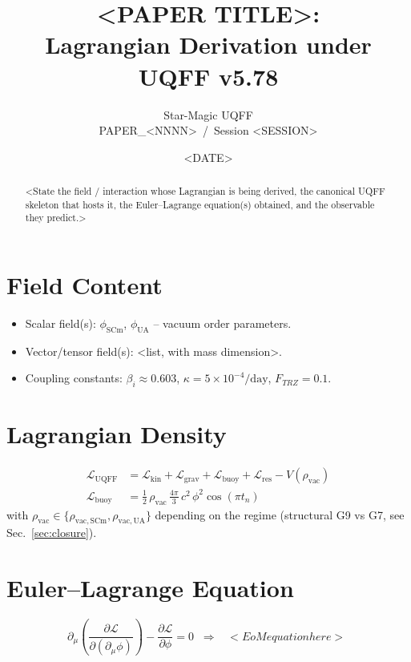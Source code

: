\documentclass[11pt]{article}
\title{<PAPER TITLE>: \\ Lagrangian Derivation under UQFF v5.78}
\author{Star-Magic UQFF \\ PAPER\_<NNNN> \,/\, Session <SESSION>}
\date{<DATE>}
\begin{document}
\maketitle

\begin{abstract}
<State the field / interaction whose Lagrangian is being derived,
the canonical UQFF skeleton that hosts it, the Euler--Lagrange equation(s)
obtained, and the observable they predict.>
\end{abstract}

\section{Field Content}
\begin{itemize}
  \item Scalar field(s): $\phi_{\mathrm{SCm}}$, $\phi_{\mathrm{UA}}$ -- vacuum order parameters.
  \item Vector/tensor field(s): <list, with mass dimension>.
  \item Coupling constants: $\beta_i \approx 0.603$, $\kappa = 5\times 10^{-4}/\mathrm{day}$, $F_{TRZ}=0.1$.
\end{itemize}

\section{Lagrangian Density}
\begin{align}
  \mathcal{L}_{\mathrm{UQFF}} &= \mathcal{L}_{\mathrm{kin}} + \mathcal{L}_{\mathrm{grav}} + \mathcal{L}_{\mathrm{buoy}} + \mathcal{L}_{\mathrm{res}} - V(\rho_{\mathrm{vac}}) \\
  \mathcal{L}_{\mathrm{buoy}} &= \tfrac{1}{2}\,\rho_{\mathrm{vac}}\,\tfrac{4\pi}{3}\,c^{2}\,\phi^{2}\cos(\pi t_n) \label{eq:Lbuoy}
\end{align}
with $\rho_{\mathrm{vac}}\in\{\rho_{\mathrm{vac,SCm}},\rho_{\mathrm{vac,UA}}\}$ depending on the regime
(structural G9 vs G7, see Sec.~\ref{sec:closure}).

\section{Euler--Lagrange Equation}
\begin{equation}
  \partial_\mu\!\left(\frac{\partial\mathcal{L}}{\partial(\partial_\mu\phi)}\right) - \frac{\partial\mathcal{L}}{\partial\phi} = 0
  \;\;\Longrightarrow\;\;
  \boxed{\;<EoM equation here>\;}
  \label{eq:tlag-eom}
\end{equation}
\end{document}
